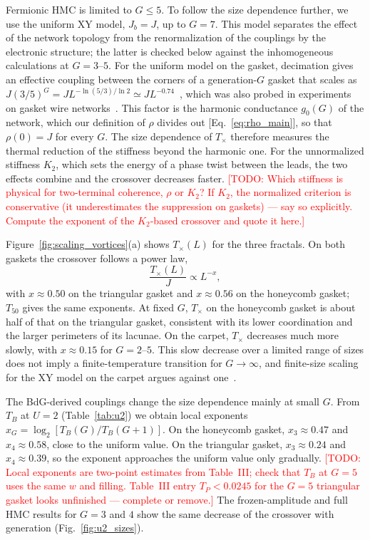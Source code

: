 \documentclass[aps,prb,twocolumn,superscriptaddress,floatfix]{revtex4-2}
\newcommand{\todo}[1]{\textcolor{red}{[TODO: #1]}}
\begin{document}
Fermionic HMC is limited to $G \le 5$. To follow the size dependence further,
we use the uniform XY model, $J_b = J$, up to $G = 7$. This model separates the
effect of the network topology from the renormalization of the couplings by
the electronic structure; the latter is checked below against the
inhomogeneous calculations at $G = 3$--$5$. For the uniform model on the
gasket, decimation gives an effective coupling between the corners of a
generation-$G$ gasket that scales as
$J(3/5)^G = J L^{-\ln(5/3)/\ln 2} \simeq J L^{-0.74}$~\cite{Vallat1991},
which was also probed in experiments on gasket wire networks~\cite{Meyer2002}.
This factor is the harmonic conductance $g_0(G)$ of the network, which our
definition of $\rho$ divides out [Eq.~\eqref{eq:rho_main}], so that
$\rho(0) = J$ for every $G$. The size dependence of $T_\times$ therefore
measures the thermal reduction of the stiffness beyond the harmonic one. For
the unnormalized stiffness $K_2$, which sets the energy of a phase twist
between the leads, the two effects combine and the crossover decreases faster.
\todo{Which stiffness is physical for two-terminal coherence, $\rho$ or $K_2$?
If $K_2$, the normalized criterion is conservative (it underestimates the
suppression on gaskets) --- say so explicitly. Compute the exponent of the
$K_2$-based crossover and quote it here.}

Figure~\ref{fig:scaling_vortices}(a) shows $T_\times(L)$ for the three
fractals. On both gaskets the crossover follows a power law,
\begin{equation}
\frac{T_\times(L)}{J} \propto L^{-x},
\label{eq:Tstar_powerlaw}
\end{equation}
with $x \approx 0.50$ on the triangular gasket and $x \approx 0.56$ on the
honeycomb gasket; $T_{50}$ gives the same exponents. At fixed $G$, $T_\times$
on the honeycomb gasket is about half of that on the triangular gasket,
consistent with its lower coordination and the larger perimeters of its
lacunae. On the carpet, $T_\times$ decreases much more slowly, with
$x \approx 0.15$ for $G = 2$--$5$. This slow decrease over a limited range of
sizes does not imply a finite-temperature transition for $G \to \infty$, and
finite-size scaling for the XY model on the carpet argues against
one~\cite{Carpet13}.

The BdG-derived couplings change the size dependence mainly at small $G$. From
$T_B$ at $U = 2$ (Table~\ref{tab:u2}) we obtain local exponents
$x_G = \log_2[T_B(G)/T_B(G+1)]$. On the honeycomb gasket,
$x_3 \approx 0.47$ and $x_4 \approx 0.58$, close to the uniform value. On the
triangular gasket, $x_3 \approx 0.24$ and $x_4 \approx 0.39$, so the exponent
approaches the uniform value only gradually.
\todo{Local exponents are two-point estimates from Table~III; check that $T_B$
at $G=5$ uses the same $w$ and filling. Table~III entry $T_P<0.0245$ for the
$G=5$ triangular gasket looks unfinished --- complete or remove.}
The frozen-amplitude and full HMC results for $G = 3$ and $4$ show the same
decrease of the crossover with generation (Fig.~\ref{fig:u2_sizes}).
\end{document}
